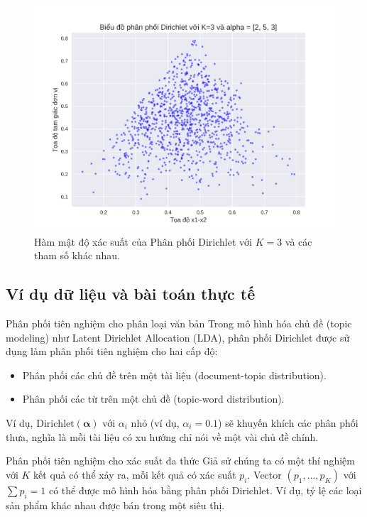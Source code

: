 \begin{figure}[h!]
\centering
\includegraphics[width=B0.7\textwidth]{images/Dirichlet Distribution-CDF.png} %
\caption{Hàm mật độ xác suất của Phân phối Dirichlet với $K=3$ và các tham số khác nhau.}
\label{fig:pngDirichlet+Distribution_CDF}
\end{figure}

\subsection{Ví dụ dữ liệu và bài toán thực tế}
Phân phối tiên nghiệm cho phân loại văn bản
Trong mô hình hóa chủ đề (topic modeling) như Latent Dirichlet Allocation (LDA), phân phối Dirichlet được sử dụng làm phân phối tiên nghiệm cho hai cấp độ:
\begin{itemize}
\item Phân phối các chủ đề trên một tài liệu (document-topic distribution).
\item Phân phối các từ trên một chủ đề (topic-word distribution).
\end{itemize}
Ví dụ, $\text{Dirichlet}(\boldsymbol{\alpha})$ với $\alpha_i$ nhỏ (ví dụ, $\alpha_i=0.1$) sẽ khuyến khích các phân phối thưa, nghĩa là mỗi tài liệu có xu hướng chỉ nói về một vài chủ đề chính.

Phân phối tiên nghiệm cho xác suất đa thức
Giả sử chúng ta có một thí nghiệm với $K$ kết quả có thể xảy ra, mỗi kết quả có xác suất $p_i$. Vector $(p_1, \dots, p_K)$ với $\sum p_i = 1$ có thể được mô hình hóa bằng phân phối Dirichlet. Ví dụ, tỷ lệ các loại sản phẩm khác nhau được bán trong một siêu thị.


